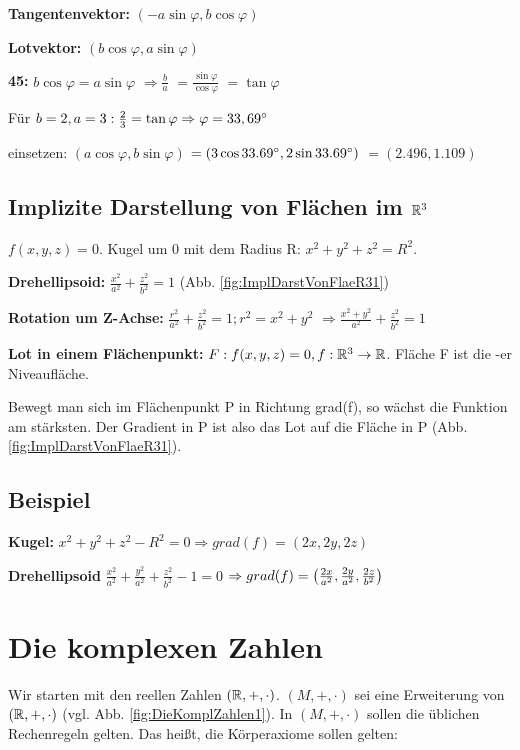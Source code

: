 \textbf{Tangentenvektor:} $(- a \sin \varphi, b \cos \varphi)$

\textbf{Lotvektor:} $(b \cos \varphi, a \sin \varphi)$

\textbf{45\grad:} $b\cos \varphi = a\sin \varphi$ 
$\Rightarrow \frac{b}{a} $
$=\frac{\sin \varphi}{\cos \varphi}$
$=\tan \varphi$

Für $b=2, a=3: \frac{2}{3}=\tan \varphi \Rightarrow \varphi=33,69^\circ$

einsetzen: $(a \cos \varphi, b\sin \varphi)$
$=(3\cos 33.69^\circ, 2\sin 33.69^\circ)$
$=(2.496, 1.109)$

\subsection{Implizite Darstellung von Flächen im $\mathbb{R}^3$}

$f(x,y,z)=0$. Kugel um 0 mit dem Radius R: $x^2+y^2+z^2=R^2$.

\textbf{Drehellipsoid:} $\frac{x^2}{a^2} + \frac{z^2}{b^2} = 1$ (Abb. \ref{fig:ImplDarstVonFlaeR31})

\textbf{Rotation um Z-Achse:} $ \frac{r^2}{a^2} + \frac{z^2}{b^2} = 1; r^2=x^2+y^2$ 
$\Rightarrow \frac{x^2+y^2}{a^2} + \frac{z^2}{b^2} = 1$

\textbf{Lot in einem Flächenpunkt:}
$F: f(x,y,z) = 0, f:\mathbb{R}^3 \rightarrow \mathbb{R}$. Fläche F ist die -er Niveaufläche\grqq.

Bewegt man sich im Flächenpunkt P in Richtung grad(f), so wächst die Funktion am stärksten. Der Gradient in P ist also das Lot auf die Fläche in P (Abb. \ref{fig:ImplDarstVonFlaeR31}).

\subsection{Beispiel}

\textbf{Kugel:} $x^2+y^2+z^2-R^2 = 0 \Rightarrow grad(f) = (2x,2y,2z)$

\textbf{Drehellipsoid} $\frac{x^2}{a^2} + \frac{y^2}{a^2} + \frac{z^2}{b^2} -1 = 0$
$\Rightarrow grad(f) =  \left( \frac{2x}{a^2}, \frac{2y}{a^2}, \frac{2z}{b^2} \right) $

\section{Die komplexen Zahlen}
Wir starten mit den reellen Zahlen $(\mathbb{R},+,\cdot)$. $(M,+,\cdot)$ sei eine Erweiterung von $(\mathbb{R},+,\cdot)$ (vgl. Abb. \ref{fig:DieKomplZahlen1}). In $(M,+,\cdot)$ sollen die üblichen Rechenregeln gelten. Das heißt, die Körperaxiome sollen gelten:

